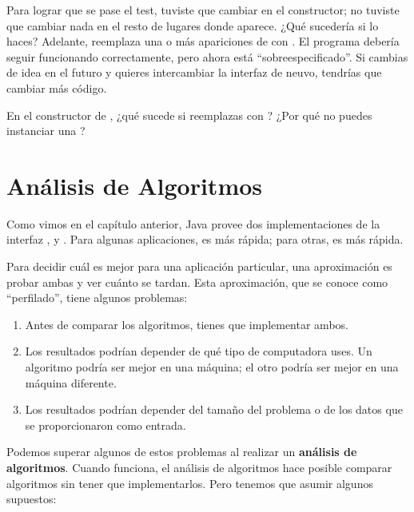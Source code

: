 \documentclass[12pt]{book}
\theoremstyle{exercise}
\begin{document}
Para lograr que se pase el test, tuviste que cambiar  en
el constructor; no tuviste que cambiar nada en el resto de lugares donde
 aparece. ¿Qué sucedería si lo haces?  Adelante, reemplaza una
o más apariciones de  con . El programa
debería seguir funcionando correctamente, pero ahora está
``sobreespecificado''. Si cambias de idea en el futuro y quieres intercambiar
la interfaz de neuvo, tendrías que cambiar más código.

En el constructor de , ¿qué sucede si reemplazas
 con ? ¿Por qué no puedes instanciar una ?



\chapter{Análisis de Algoritmos}
\label{cs-analysis-of-algorithms-readme}

Como vimos en el capítulo anterior, Java provee dos
implementaciones de la interfaz ,  y
. Para algunas aplicaciones,  es más rápida;
para otras,  es más rápida.


Para decidir cuál es mejor para una aplicación particular, una aproximación
es probar ambas y ver cuánto se tardan. Esta aproximación, que se conoce
como ``perfilado'', tiene algunos problemas:

\begin{enumerate}

\item Antes de comparar los algoritmos, tienes que implementar ambos.

\item Los resultados podrían depender de qué tipo de computadora uses. Un 
  algoritmo podría ser mejor en una máquina; el otro podría ser mejor
  en una máquina diferente.

\item Los resultados podrían depender del tamaño del problema o de los datos
  que se proporcionaron como entrada.

\end{enumerate}

Podemos superar algunos de estos problemas al realizar un {\bf análisis de
algoritmos}. Cuando funciona, el análisis de algoritmos hace posible
comparar algoritmos sin tener que implementarlos. Pero tenemos que
asumir algunos supuestos:
\end{document}
